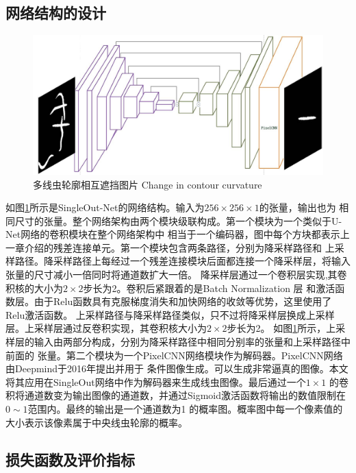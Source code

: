 \subsection{网络结构的设计}
\label{archtecture}
\begin{figure}[htb]
	  \centering
	  \includegraphics[width=14cm]{figure/chap4/arch1.jpg}
	  \bicaption
		{多线虫轮廓相互遮挡图片}
		{Change in contour curvature}
	  \label{fig:chap4:netarch}
	\end{figure}
	如图\ref{fig:chap4:netarch}所示是SingleOut-Net的网络结构。输入为$256\times256\times1$的张量，输出也为
	相同尺寸的张量。整个网络架构由两个模块级联构成。第一个模块为一个类似于U-Net网络\cite{ronneberger2015u}的卷积模块在整个网络架构中
	相当于一个编码器，图中每个方块都表示上一章介绍的残差连接单元。第一个模块包含两条路径，分别为降采样路径和
	上采样路径。降采样路径上每经过一个残差连接模块后面都连接一个降采样层，将输入张量的尺寸减小一倍同时将通道数扩大一倍。
	降采样层通过一个卷积层实现,其卷积核的大小为$2\times2$步长为2。卷积后紧跟着的是Batch Normalization 层
	和激活函数层。由于Relu函数\cite{xu2015empirical}具有克服梯度消失和加快网络的收敛等优势，这里使用了Relu激活函数。
	上采样路径与降采样路径类似，只不过将降采样层换成上采样层。上采样层通过反卷积实现，其卷积核大小为$2\times2$步长为2。
	如图\ref{fig:chap4:netarch}所示，上采样层的输入由两部分构成，分别为降采样路径中相同分别率的张量和上采样路径中前面的
	张量。第二个模块为一个PixelCNN网络\cite{van2016conditional}模块作为解码器。PixelCNN网络由Deepmind于2016年提出并用于
	条件图像生成。可以生成非常逼真的图像。本文将其应用在SingleOut网络中作为解码器来生成线虫图像。最后通过一个$1\times1$
	的卷积将通道数变为输出图像的通道数，并通过Sigmoid激活函数将输出的数值限制在$0\sim1$范围内。最终的输出是一个通道数为1
	的概率图。概率图中每一个像素值的大小表示该像素属于中央线虫轮廓的概率。

\subsection{损失函数及评价指标}
	
